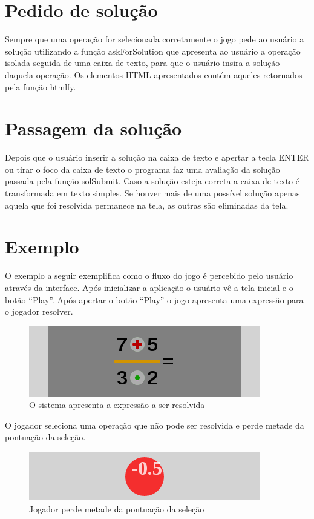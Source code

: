 \section{Pedido de solução}
Sempre que uma operação for selecionada corretamente o jogo pede ao usuário a solução utilizando a função askForSolution que apresenta ao usuário a operação isolada seguida de uma caixa de texto, para que o usuário insira a solução daquela operação. Os elementos HTML apresentados contém aqueles retornados pela função htmlfy.

\section{Passagem da solução}
Depois que o usuário inserir a solução na caixa de texto e apertar a tecla ENTER ou tirar o foco da caixa de texto o programa faz uma avaliação da solução passada pela função solSubmit. Caso a solução esteja correta a caixa de texto é transformada em texto simples. Se houver mais de uma possível solução apenas aquela que foi resolvida permanece na tela, as outras são eliminadas da tela.

\section{Exemplo}
O exemplo a seguir exemplifica como o fluxo do jogo é percebido pelo usuário através da interface. Após inicializar a aplicação o usuário vê a tela inicial e o botão “Play”. Após apertar o botão “Play” o jogo apresenta uma expressão para o jogador resolver.

\begin{figure}[H]
	\caption{\label{xp_1} O sistema apresenta a expressão a ser resolvida}
	\begin{center}
	    \includegraphics[scale=1]{xp_4_1.png}
	\end{center}
\end{figure}

O jogador seleciona uma operação que não pode ser resolvida e perde metade da pontuação da seleção.

\begin{figure}[H]
	\caption{\label{miss_0_5_1}Jogador perde metade da pontuação da seleção}
	\begin{center}
	    \includegraphics[scale=1]{miss_0_5.png}
	\end{center}
\end{figure}

